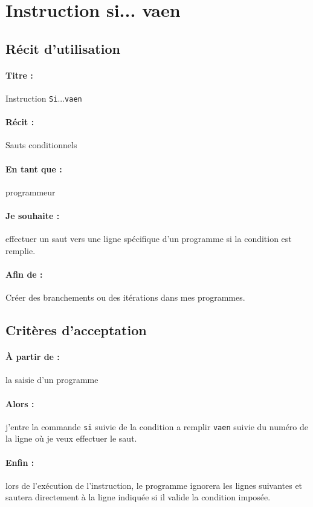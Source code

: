 \section{Instruction si... vaen}
	\subsection*{Récit d'utilisation}

	\paragraph{Titre : } Instruction \verb|Si|...\verb|vaen|
	\paragraph{Récit : } Sauts conditionnels
	\paragraph{En tant que : } programmeur
	\paragraph{Je souhaite : } effectuer un saut vers une ligne
	spécifique d'un programme si la condition est remplie.
	\paragraph{Afin de : } Créer des branchements ou des itérations
	dans mes programmes.
	\newpage
	\subsection*{Critères d'acceptation}

	\paragraph{À partir de : } la saisie d'un programme
	\paragraph{Alors : } j'entre la commande \verb|si| suivie de la condition a remplir \verb|vaen| suivie du numéro
	de la ligne où je veux effectuer le saut.
	\paragraph{Enfin : } lors de l'exécution de l'instruction, le programme
	ignorera les lignes suivantes et sautera directement à la ligne
	indiquée si il valide la condition imposée.